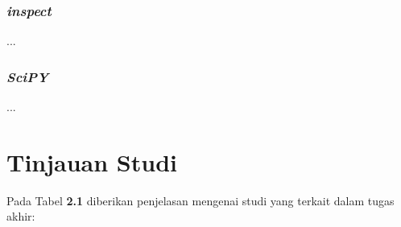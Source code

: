 \subsubsection{\textit{inspect}}
...
\\
\subsubsection{\textit{SciPY}}
...
\\
\section{Tinjauan Studi}
\par Pada Tabel \textbf{2.1} diberikan penjelasan mengenai studi yang terkait dalam tugas akhir:

\begingroup
\setlength{\LTleft}{-20cm plus -1fill}
\setlength{\LTright}{\LTleft}

